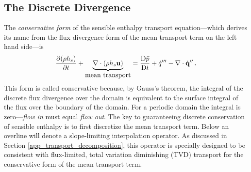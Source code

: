 



\subsection{The Discrete Divergence}
\label{discrete_divergence}

The \emph{conservative form} of the sensible enthalpy transport equation---which derives its name from the flux divergence form of the mean transport term on the left hand side---is
\begin{equation}
\label{eqn_conservative_enthalpy}
\frac{\partial (\rho h_s)}{\partial t} + \underbrace{\nabla\cdot(\rho h_s \mathbf{u})}_{\mbox{mean transport}} = \frac{\mbox{D} \bar{p}}{\mbox{D} t} + \dot{q}^{\prime\prime\prime} - \nabla\cdot \dot{\mathbf{q}}^{\prime\prime} \,\mbox{.}
\end{equation}
This form is called conservative because, by Gauss's theorem, the integral of the discrete flux divergence over the domain is equivalent to the surface integral of the flux over the boundary of the domain.  For a periodic domain the integral is zero---\emph{flow in} must equal \emph{flow out}. The key to guaranteeing discrete conservation of sensible enthalpy is to first discretize the mean transport term.  Below an overline will denote a slope-limiting interpolation operator.  As discussed in Section \ref{app_transport_decomposition}, this operator is specially designed to be consistent with flux-limited, total variation diminishing (TVD) transport for the conservative form of the mean transport term.

